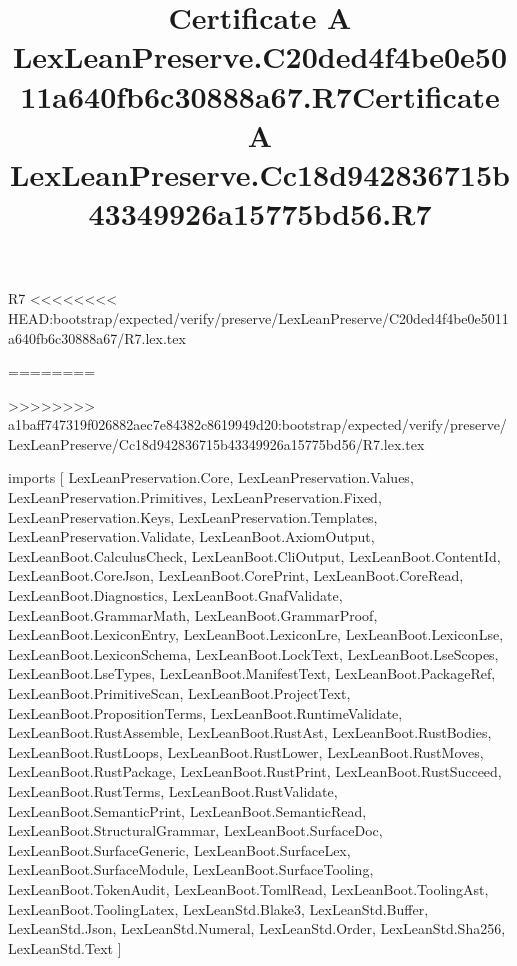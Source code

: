 \begin{lexlean}{R7}
<<<<<<<< HEAD:bootstrap/expected/verify/preserve/LexLeanPreserve/C20ded4f4be0e5011a640fb6c30888a67/R7.lex.tex
\title{Certificate A LexLeanPreserve.C20ded4f4be0e5011a640fb6c30888a67.R7}
========
\title{Certificate A LexLeanPreserve.Cc18d942836715b43349926a15775bd56.R7}
>>>>>>>> a1baff747319f026882aec7e84382c8619949d20:bootstrap/expected/verify/preserve/LexLeanPreserve/Cc18d942836715b43349926a15775bd56/R7.lex.tex
\begin{coremodule}
imports [
  LexLeanPreservation.Core,
  LexLeanPreservation.Values,
  LexLeanPreservation.Primitives,
  LexLeanPreservation.Fixed,
  LexLeanPreservation.Keys,
  LexLeanPreservation.Templates,
  LexLeanPreservation.Validate,
  LexLeanBoot.AxiomOutput,
  LexLeanBoot.CalculusCheck,
  LexLeanBoot.CliOutput,
  LexLeanBoot.ContentId,
  LexLeanBoot.CoreJson,
  LexLeanBoot.CorePrint,
  LexLeanBoot.CoreRead,
  LexLeanBoot.Diagnostics,
  LexLeanBoot.GnafValidate,
  LexLeanBoot.GrammarMath,
  LexLeanBoot.GrammarProof,
  LexLeanBoot.LexiconEntry,
  LexLeanBoot.LexiconLre,
  LexLeanBoot.LexiconLse,
  LexLeanBoot.LexiconSchema,
  LexLeanBoot.LockText,
  LexLeanBoot.LseScopes,
  LexLeanBoot.LseTypes,
  LexLeanBoot.ManifestText,
  LexLeanBoot.PackageRef,
  LexLeanBoot.PrimitiveScan,
  LexLeanBoot.ProjectText,
  LexLeanBoot.PropositionTerms,
  LexLeanBoot.RuntimeValidate,
  LexLeanBoot.RustAssemble,
  LexLeanBoot.RustAst,
  LexLeanBoot.RustBodies,
  LexLeanBoot.RustLoops,
  LexLeanBoot.RustLower,
  LexLeanBoot.RustMoves,
  LexLeanBoot.RustPackage,
  LexLeanBoot.RustPrint,
  LexLeanBoot.RustSucceed,
  LexLeanBoot.RustTerms,
  LexLeanBoot.RustValidate,
  LexLeanBoot.SemanticPrint,
  LexLeanBoot.SemanticRead,
  LexLeanBoot.StructuralGrammar,
  LexLeanBoot.SurfaceDoc,
  LexLeanBoot.SurfaceGeneric,
  LexLeanBoot.SurfaceLex,
  LexLeanBoot.SurfaceModule,
  LexLeanBoot.SurfaceTooling,
  LexLeanBoot.TokenAudit,
  LexLeanBoot.TomlRead,
  LexLeanBoot.ToolingAst,
  LexLeanBoot.ToolingLatex,
  LexLeanStd.Blake3,
  LexLeanStd.Buffer,
  LexLeanStd.Json,
  LexLeanStd.Numeral,
  LexLeanStd.Order,
  LexLeanStd.Sha256,
  LexLeanStd.Text
]


\end{coremodule}
\end{lexlean}
